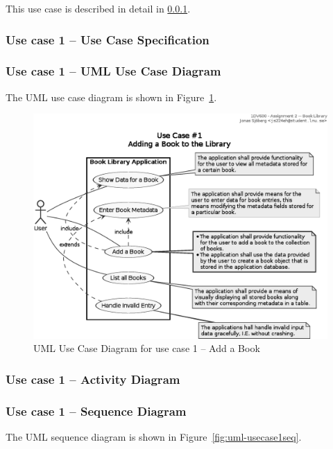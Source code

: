 This use case is described in detail in \ref{task-1a-usecase1spec}.


\subsubsection{Use case 1 -- Use Case Specification}\label{task-1a-usecase1spec}



\subsubsection{Use case 1 -- UML Use Case Diagram}\label{task-1a-usecase1uml}
The UML use case diagram is shown in Figure~\ref{fig:uml-usecase1}.

\begin{figure}[htbp]
  \centering
  \includegraphics[width=\linewidth]{include/uml-use-case-1.eps}
  \caption{UML Use Case Diagram for use case 1 -- Add a Book}
  \label{fig:uml-usecase1}
\end{figure}


\subsubsection{Use case 1 -- Activity Diagram}\label{task-1a-usecase1activity}


\subsubsection{Use case 1 -- Sequence Diagram}\label{task-1a-usecase1seq}
The UML sequence diagram is shown in Figure~\ref{fig:uml-usecase1seq}.

